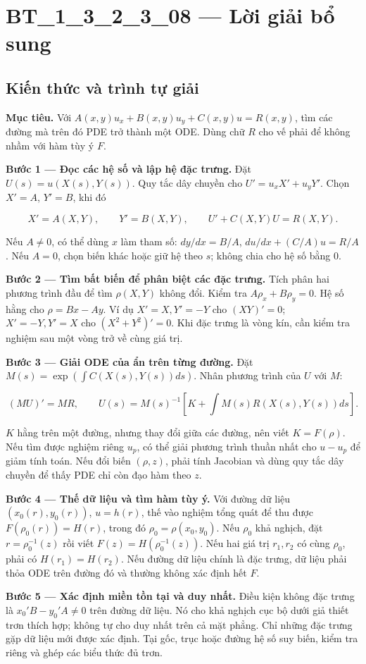 \documentclass[10pt,a4paper]{article}
\begin{document}
\section*{BT\_1\_3\_2\_3\_08 — Lời giải bổ sung}
\subsection*{Kiến thức và trình tự giải}
\textbf{Mục tiêu.} Với $A(x,y)u_x+B(x,y)u_y+C(x,y)u=R(x,y)$, tìm các đường mà trên đó PDE trở thành một ODE. Dùng chữ $R$ cho vế phải để không nhầm với hàm tùy ý $F$.

\textbf{Bước 1 — Đọc các hệ số và lập hệ đặc trưng.} Đặt $U(s)=u(X(s),Y(s))$. Quy tắc dây chuyền cho $U'=u_xX'+u_yY'$. Chọn $X'=A$, $Y'=B$, khi đó

\[
X'=A(X,Y),\qquad Y'=B(X,Y),\qquad U'+C(X,Y)U=R(X,Y).
\]

Nếu $A\ne0$, có thể dùng $x$ làm tham số: $dy/dx=B/A$, $du/dx+(C/A)u=R/A$. Nếu $A=0$, chọn biến khác hoặc giữ hệ theo $s$; không chia cho hệ số bằng 0.

\textbf{Bước 2 — Tìm bất biến để phân biệt các đặc trưng.} Tích phân hai phương trình đầu để tìm $\rho(X,Y)$ không đổi. Kiểm tra $A\rho_x+B\rho_y=0$. Hệ số hằng cho $\rho=Bx-Ay$. Ví dụ $X'=X,Y'=-Y$ cho $(XY)'=0$; $X'=-Y,Y'=X$ cho $(X^2+Y^2)'=0$. Khi đặc trưng là vòng kín, cần kiểm tra nghiệm sau một vòng trở về cùng giá trị.

\textbf{Bước 3 — Giải ODE của ẩn trên từng đường.} Đặt $M(s)=\exp(\int C(X(s),Y(s))ds)$. Nhân phương trình của $U$ với $M$:

\[
(MU)'=MR,\qquad
U(s)=M(s)^{-1}\left[K+\int M(s)R(X(s),Y(s))ds\right].
\]

$K$ hằng trên một đường, nhưng thay đổi giữa các đường, nên viết $K=F(\rho)$. Nếu tìm được nghiệm riêng $u_p$, có thể giải phương trình thuần nhất cho $u-u_p$ để giảm tính toán. Nếu đổi biến $(\rho,z)$, phải tính Jacobian và dùng quy tắc dây chuyền để thấy PDE chỉ còn đạo hàm theo $z$.

\textbf{Bước 4 — Thế dữ liệu và tìm hàm tùy ý.} Với đường dữ liệu $(x_0(r),y_0(r))$, $u=h(r)$, thế vào nghiệm tổng quát để thu được $F(\rho_0(r))=H(r)$, trong đó $\rho_0=\rho(x_0,y_0)$. Nếu $\rho_0$ khả nghịch, đặt $r=\rho_0^{-1}(z)$ rồi viết $F(z)=H(\rho_0^{-1}(z))$. Nếu hai giá trị $r_1,r_2$ có cùng $\rho_0$, phải có $H(r_1)=H(r_2)$. Nếu đường dữ liệu chính là đặc trưng, dữ liệu phải thỏa ODE trên đường đó và thường không xác định hết $F$.

\textbf{Bước 5 — Xác định miền tồn tại và duy nhất.} Điều kiện không đặc trưng là $x_0'B-y_0'A\ne0$ trên đường dữ liệu. Nó cho khả nghịch cục bộ dưới giả thiết trơn thích hợp; không tự cho duy nhất trên cả mặt phẳng. Chỉ những đặc trưng gặp dữ liệu mới được xác định. Tại gốc, trục hoặc đường hệ số suy biến, kiểm tra riêng và ghép các biểu thức đủ trơn.
\end{document}
